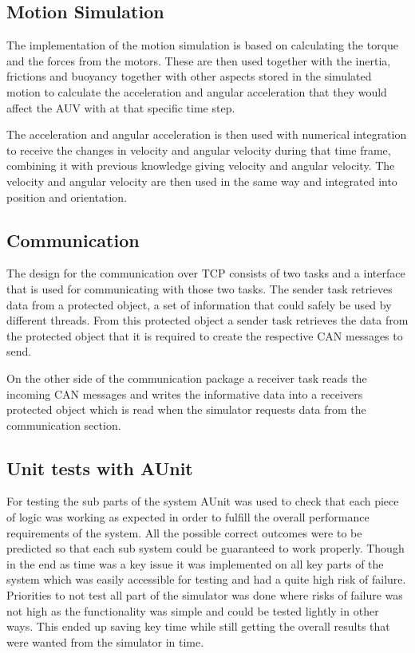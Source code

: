 \subsection{Motion Simulation}
The implementation of the motion simulation is based on calculating the torque and the forces from the motors. These are then used together with the inertia, frictions and buoyancy together with other aspects stored in the simulated motion to calculate the acceleration and angular acceleration that they would affect the AUV with at that specific time step.
 
The acceleration and angular acceleration is then used with numerical integration to receive the changes in velocity and angular velocity during that time frame, combining it with previous knowledge giving velocity and angular velocity. The velocity and angular velocity are then used in the same way and integrated into position and orientation. 

\subsection{Communication}

The design for the communication over TCP consists of two tasks and a interface that is used for communicating with those two tasks. The sender task retrieves data from a protected object, a set of information that could safely be used by different threads. From this protected object a sender task retrieves the data from the protected object that it is required to create the respective CAN messages to send.

On the other side of the communication package a receiver task reads the incoming CAN messages and writes the informative data into a receivers protected object which is read when the simulator requests data from the communication section.

\subsection{Unit tests with AUnit}

For testing the sub parts of the system AUnit was used to check that each piece of logic was working as expected in order to fulfill the overall performance requirements of the system.  All the possible correct outcomes were to be predicted so that each sub system could be guaranteed to work properly. Though in the end as time was a key issue it was implemented on all key parts of the system which was easily accessible for testing and had a quite high risk of failure. Priorities to not test all part of the simulator was done where risks of failure was not high as the functionality was simple and could be tested lightly in other ways. This ended up saving key time while still getting the overall results that were wanted from the simulator in time.

